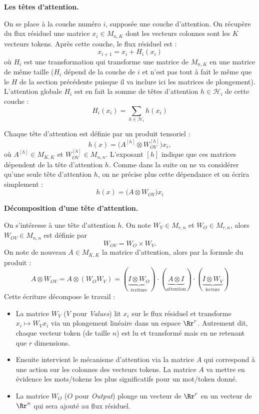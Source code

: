 \documentclass[11pt,class=report,crop=false]{standalone}
\begin{document}
\bigskip

\textbf{Les têtes d'attention.}

On se place à la couche numéro $i$, supposée une couche d'attention.
On récupère du flux résiduel une matrice $x_i \in M_{n,K}$ 
dont les vecteurs colonnes sont les $K$ vecteurs tokens.
Après cette couche, le flux résiduel est :
$$x_{i+1} = x_i + H_i ( x_i )$$
où $H_i$ est une transformation qui transforme une matrice de $M_{n,K}$ en une matrice de même taille ($H_i$ dépend de la couche de $i$ et n'est pas tout à fait le même que le $H$ de la section précédente puisque il va inclure ici les matrices de plongement).
L'attention globale $H_i$ est en fait la somme de têtes d'attention $h \in \mathcal{H}_i$ de cette couche :
$$H_i (x_i)  = \sum_{h \in \mathcal{H}_i} h (x_i) $$

Chaque tête d'attention est définie par un produit tensoriel :
$$h(x) = \big(A^{[h]} \otimes W^{[h]}_{OV} \big) x_i,$$
où $A^{[h]} \in M_{K,K}$ et $W^{[h]}_{OV} \in M_{n,n}$.
L'exposant $[h]$ indique que ces matrices dépendent de la tête d'attention $h$. Comme dans la suite on ne va considérer qu'une seule tête d'attention $h$, on ne précise plus cette dépendance et on écrira simplement :
$$h(x) = \big(A \otimes W_{OV} \big) x_i$$

\bigskip

\textbf{Décomposition d'une tête d'attention.}

On s'intéresse à une tête d'attention $h$.
On note $W_V \in M_{r,n}$ et $W_O \in M_{r,n}$, alors $W_{OV} \in M_{n,n}$ est définie par 
$$W_{OV} = W_O \times W_V.$$
On note de nouveau $A \in M_{K,K}$ la matrice d'attention, alors par la formule du produit :
\[
A \otimes W_{OV} = A \otimes (W_O W_V) = 
(\underbrace{I \otimes W_O}_{\text{écriture}}) \cdot 
(\underbrace{A \otimes I}_{\text{attention}}) \cdot (\underbrace{I \otimes W_V}_{\text{lecture}})
\]
Cette écriture décompose le travail :
\begin{itemize}
	\item La matrice $W_V$ ($V$ pour \emph{Values}) lit $x_i$ sur le flux résiduel et transforme $x_i \mapsto W_V x_i$  via un plongement linéaire dans un espace $\Rr^r$. Autrement dit, chaque vecteur token (de taille $n$) est lu et transformé mais en ne retenant que $r$ dimensions.
	
	\item Ensuite intervient le mécanisme d'attention via la matrice $A$ qui correspond à une action sur les colonnes des vecteurs tokens. La matrice $A$ va mettre en évidence les mots/tokens les plus significatifs pour un mot/token donné.
	
	\item La matrice $W_O$ ($O$ pour \emph{Output}) plonge un vecteur de $\Rr^r$ en un vecteur de $\Rr^n$ qui sera ajouté au flux résiduel.
\end{itemize}
\end{document}
